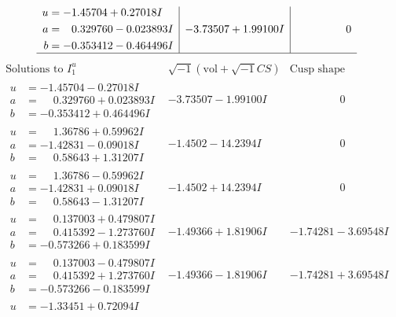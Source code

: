 \documentclass[1p]{elsarticle_modified}
\theoremstyle{definition}
\newcommand{\I}{\sqrt{-1}}
\begin{document}
$$\begin{array}{c|c|c}
\begin{aligned}
u &= -1.45704 + 0.27018 I \\
a &= \phantom{-}0.329760 - 0.023893 I \\
b &= -0.353412 - 0.464496 I\end{aligned}
 & -3.73507 + 1.99100 I & \phantom{-0.000000 } 0\\
 \hline 
 \end{array}$$\newpage$$\begin{array}{c|c|c}  
\text{Solutions to }I^u_{1}& \I (\text{vol} + \sqrt{-1}CS) & \text{Cusp shape}\\
 \hline 
\begin{aligned}
u &= -1.45704 - 0.27018 I \\
a &= \phantom{-}0.329760 + 0.023893 I \\
b &= -0.353412 + 0.464496 I\end{aligned}
 & -3.73507 - 1.99100 I & \phantom{-0.000000 } 0 \\ \hline\begin{aligned}
u &= \phantom{-}1.36786 + 0.59962 I \\
a &= -1.42831 - 0.09018 I \\
b &= \phantom{-}0.58643 + 1.31207 I\end{aligned}
 & -1.4502 - 14.2394 I & \phantom{-0.000000 } 0 \\ \hline\begin{aligned}
u &= \phantom{-}1.36786 - 0.59962 I \\
a &= -1.42831 + 0.09018 I \\
b &= \phantom{-}0.58643 - 1.31207 I\end{aligned}
 & -1.4502 + 14.2394 I & \phantom{-0.000000 } 0 \\ \hline\begin{aligned}
u &= \phantom{-}0.137003 + 0.479807 I \\
a &= \phantom{-}0.415392 - 1.273760 I \\
b &= -0.573266 + 0.183599 I\end{aligned}
 & -1.49366 + 1.81906 I & -1.74281 - 3.69548 I \\ \hline\begin{aligned}
u &= \phantom{-}0.137003 - 0.479807 I \\
a &= \phantom{-}0.415392 + 1.273760 I \\
b &= -0.573266 - 0.183599 I\end{aligned}
 & -1.49366 - 1.81906 I & -1.74281 + 3.69548 I \\ \hline\begin{aligned}
u &= -1.33451 + 0.72094 I \\

\end{aligned}
\end{array}$$
\end{document}
